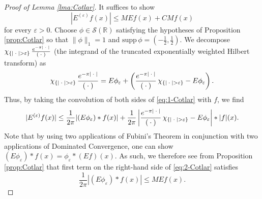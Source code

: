 \documentclass[../dissertation.tex]{subfiles}
\begin{document}
\begin{proof}[Proof of Lemma \ref{lma:Cotlar}]
    It suffices to show 
    \[
        |E^{(\varepsilon)} f(x)| \leq M E f(x) + C M f(x)
    \]
    for every $\varepsilon > 0$. Choose $\phi \in \mathscr S(\mathbb R)$ satisfying the 
    hypotheses of Proposition \ref{prop:Cotlar} so that $\| \phi\|_1 = 1$ and 
    $\text{supp} \, \phi = \left(-\frac{1}{2}, \frac{1}{2} \right)$. We decompose 
    $\chi_{\{|\kern 0.5ex \cdot \kern 0.5ex| > \varepsilon\}} \, \frac{e^{-\pi |\kern 0.5ex \cdot \kern 0.5ex|}}{(\kern 0.5ex \cdot \kern 0.5ex)}$ (the integrand 
    of the truncated exponentially weighted Hilbert transform) as
    \begin{align}\label{eq:1-Cotlar}
    	\chi_{\{|\kern 0.5ex \cdot \kern 0.5ex| > \varepsilon\}} \, \frac{e^{-\pi |\kern 0.5ex \cdot \kern 0.5ex|}}{(\kern 0.5ex \cdot \kern 0.5ex)}
    		= E \phi_\varepsilon +
            	\left( 
            		 \frac{e^{-\pi |\kern 0.5ex \cdot \kern 0.5ex|}}{(\kern 0.5ex \cdot \kern 0.5ex)} \, \chi_{\{|\kern 0.5ex \cdot \kern 0.5ex| > \varepsilon\}}
            			- E \phi_\varepsilon 
        	   	\right).
    \end{align}
    Thus, by taking the convolution of both sides of \eqref{eq:1-Cotlar} with $f$, we find
    \begin{align}\label{eq:2-Cotlar}
        |E^{(\varepsilon)} f(x)|
            \leq \frac{1}{2\pi} | (E\phi_\varepsilon)*f(x)| 
                + \frac{1}{2\pi} 
                	\left| 
                		\frac{e^{-\pi |\kern 0.5ex \cdot \kern 0.5ex|}}{(\kern 0.5ex \cdot \kern 0.5ex)} \, \chi_{\{|\kern 0.5ex \cdot \kern 0.5ex| > \varepsilon\}}
                			- E\phi_\varepsilon 
                	\right|*|f|(x).
    \end{align}
    Note that by using two applications of Fubini's Theorem in conjunction with two 
    applications of Dominated Convergence, one can show
    $(E\phi_\varepsilon)*f(x) = \phi_\varepsilon * (Ef)(x)$. As such, we therefore 
    see from Proposition \ref{prop:Cotlar} that first term on the right-hand side 
    of \eqref{eq:2-Cotlar} satisfies
    \[
        \frac{1}{2 \pi} | (E\phi_\varepsilon)*f(x)| \leq M E f(x).
    \]


\end{proof}
\end{document}
